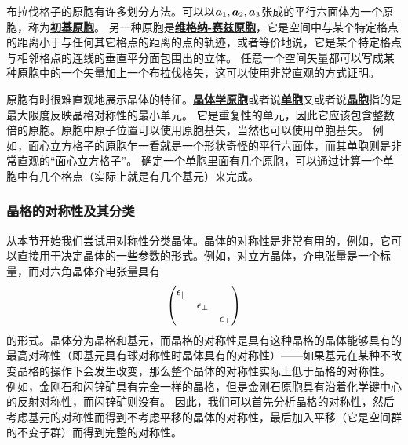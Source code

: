 \documentclass[hyperref, UTF8, a4paper]{ctexart}
\newcommand*{\concept}[1]{\underline{\textbf{#1}}}
\begin{document}
布拉伐格子的原胞有许多划分方法。可以以$\vb*{a}_1, \vb*{a}_2, \vb*{a}_3$张成的平行六面体为一个原胞，称为\concept{初基原胞}。
另一种原胞是\concept{维格纳-赛兹原胞}，它是空间中与某个特定格点的距离小于与任何其它格点的距离的点的轨迹，或者等价地说，它是某个特定格点与相邻格点的连线的垂直平分面包围出的立体。
任意一个空间矢量都可以写成某种原胞中的一个矢量加上一个布拉伐格矢，这可以使用非常直观的方式证明。

原胞有时很难直观地展示晶体的特征。\concept{晶体学原胞}或者说\concept{单胞}又或者说\concept{晶胞}指的是最大限度反映晶格对称性的最小单元。
它是重复性的单元，因此它应该包含整数倍的原胞。原胞中原子位置可以使用原胞基矢，当然也可以使用单胞基矢。
例如，面心立方格子的原胞乍一看就是一个形状奇怪的平行六面体，而其单胞则是非常直观的“面心立方格子”。
确定一个单胞里面有几个原胞，可以通过计算一个单胞中有几个格点（实际上就是有几个基元）来完成。

\subsubsection{晶格的对称性及其分类}

从本节开始我们尝试用对称性分类晶体。晶体的对称性是非常有用的，例如，它可以直接用于决定晶体的一些参数的形式。例如，对立方晶体，介电张量是一个标量，而对六角晶体介电张量具有
\[
    \pmqty{\dmat{\epsilon_\parallel, \epsilon_\bot, \epsilon_\bot}}
\]
的形式。晶体分为晶格和基元，而晶格的对称性是具有这种晶格的晶体能够具有的最高对称性（即基元具有球对称性时晶体具有的对称性）——如果基元在某种不改变晶格的操作下会发生改变，那么整个晶体的对称性实际上低于晶格的对称性。
例如，金刚石和闪锌矿具有完全一样的晶格，但是金刚石原胞具有沿着化学键中心的反射对称性，而闪锌矿则没有。 %
因此，我们可以首先分析晶格的对称性，然后考虑基元的对称性而得到不考虑平移的晶体的对称性，最后加入平移（它是空间群的不变子群）而得到完整的对称性。
\end{document}

